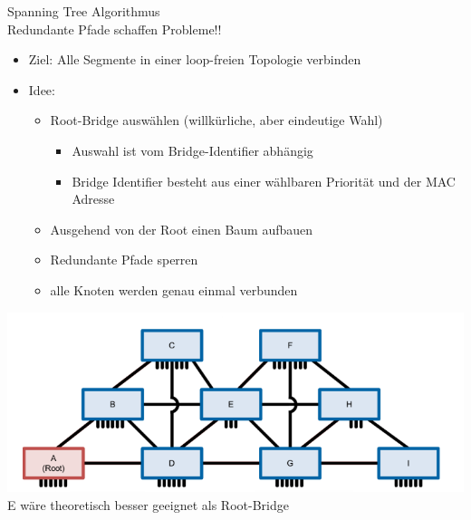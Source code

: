 \begin{concept}{Spanning Tree Algorithmus}\\
    Redundante Pfade schaffen Probleme!!
    \begin{itemize}
        \item Ziel: Alle Segmente in einer loop-freien Topologie verbinden
        \item Idee:
        \begin{itemize}
            \item Root-Bridge auswählen (willkürliche, aber eindeutige Wahl) 
            \begin{itemize}
                \item Auswahl ist vom Bridge-Identifier abhängig
                \item Bridge Identifier besteht aus einer wählbaren Priorität und der MAC Adresse
            \end{itemize}
            \item Ausgehend von der Root einen Baum aufbauen
            \item Redundante Pfade sperren
            \item alle Knoten werden genau einmal verbunden
        \end{itemize}
    \end{itemize}
        \includegraphics[width=0.6\linewidth]{images/spanning_tree_idee.png}\\
    E wäre theoretisch besser geeignet als Root-Bridge
\end{concept}

